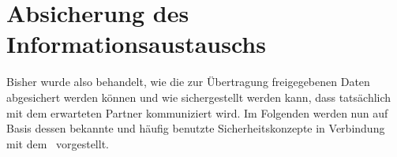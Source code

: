 \section{Absicherung des Informationsaustauschs}\label{sec:absicherung-des-informationsaustauschs}
	Bisher wurde also behandelt,
	wie die zur Übertragung freigegebenen Daten abgesichert werden können
	und wie sichergestellt werden kann,
	dass tatsächlich mit dem erwarteten Partner kommuniziert wird.
	Im Folgenden werden nun auf Basis dessen bekannte und häufig benutzte Sicherheitskonzepte
	in Verbindung mit dem~ vorgestellt.

	

	

	

	